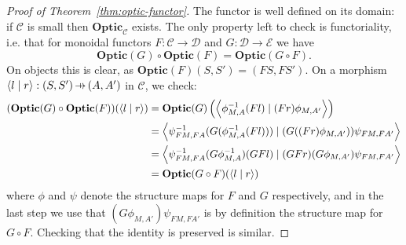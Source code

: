 \documentclass[11pt,letterpaper]{article}
\theoremstyle{plain}
\newtheorem{proposition}[theorem]{Proposition}
\theoremstyle{definition}
\newcommand{\C}{\mathscr{C}}
\newcommand{\D}{\mathscr{D}}
\newcommand{\E}{\mathscr{E}}
\newcommand{\SymmMonCat}{\mathbf{SymmMonCat}}
\newcommand{\Optic}{\mathbf{Optic}}
\newcommand{\rep}[2]{{\ensuremath \left\langle #1 \mid #2 \right\rangle}}
\newcommand{\hto}{\ensuremath{\,\mathaccent\shortmid\rightarrow\,}}
\newcommand{\todo}[1]{\textcolor{red}{\small #1}}
\begin{document}
\begin{proof}[Proof of Theorem~\ref{thm:optic-functor}]
The functor is well defined on its domain: if $\C$ is small then $\Optic_\C$ exists. The only property left to check is functoriality, i.e. that for monoidal functors $F : \C \to \D$ and $G : \D \to \E$ we have
\[ \Optic(G) \circ \Optic(F) = \Optic(G \circ F).\]
On objects this is clear, as $\Optic(F)(S, S') = (FS, FS')$. On a morphism $\rep{l}{r} : (S, S') \hto (A, A')$ in $\C$, we check:
\begin{align*}
(\Optic(G) \circ \Optic(F))(\rep{l}{r})
&= \Optic(G) \left(\rep{\phi^{-1}_{M,A} (Fl)}{(Fr) \phi_{M,A'}}\right) \\
&= \rep{\psi^{-1}_{FM,FA} (G(\phi^{-1}_{M,A} (Fl)))}{(G((Fr) \phi_{M,A'}))\psi_{FM,FA'}} \\
&= \rep{\psi^{-1}_{FM,FA} (G\phi^{-1}_{M,A}) (GFl)}{(GFr) (G\phi_{M,A'})\psi_{FM,FA'}} \\
&=\Optic(G \circ F)(\rep{l}{r})
\end{align*}
where $\phi$ and $\psi$ denote the structure maps for $F$ and $G$ respectively, and in the last step we use that $(G\phi_{M,A'})\psi_{FM,FA'}$ is by definition the structure map for $G \circ F$. Checking that the identity is preserved is similar.
%
%
\end{proof}

\end{document}
